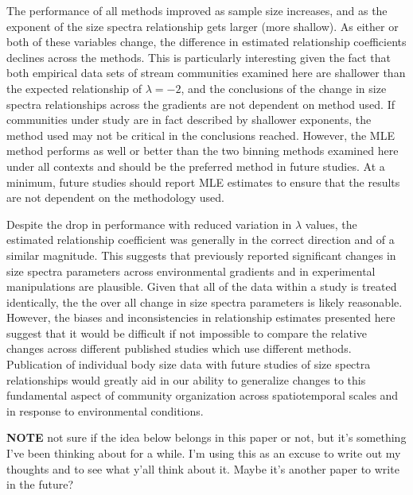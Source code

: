 \documentclass[
]{article}
\begin{document}
The performance of all methods improved as sample size increases, and as
the exponent of the size spectra relationship gets larger (more
shallow). As either or both of these variables change, the difference in
estimated relationship coefficients declines across the methods. This is
particularly interesting given the fact that both empirical data sets of
stream communities examined here are shallower than the expected
relationship of \(\lambda = -2\), and the conclusions of the change in
size spectra relationships across the gradients are not dependent on
method used. If communities under study are in fact described by
shallower exponents, the method used may not be critical in the
conclusions reached. However, the MLE method performs as well or better
than the two binning methods examined here under all contexts and should
be the preferred method in future studies. At a minimum, future studies
should report MLE estimates to ensure that the results are not dependent
on the methodology used.

Despite the drop in performance with reduced variation in \(\lambda\)
values, the estimated relationship coefficient was generally in the
correct direction and of a similar magnitude. This suggests that
previously reported significant changes in size spectra parameters
across environmental gradients and in experimental manipulations are
plausible. Given that all of the data within a study is treated
identically, the the over all change in size spectra parameters is
likely reasonable. However, the biases and inconsistencies in
relationship estimates presented here suggest that it would be difficult
if not impossible to compare the relative changes across different
published studies which use different methods. Publication of individual
body size data with future studies of size spectra relationships would
greatly aid in our ability to generalize changes to this fundamental
aspect of community organization across spatiotemporal scales and in
response to environmental conditions.

\textbf{NOTE} not sure if the idea below belongs in this paper or not,
but it's something I've been thinking about for a while. I'm using this
as an excuse to write out my thoughts and to see what y'all think about
it. Maybe it's another paper to write in the future?
\end{document}
